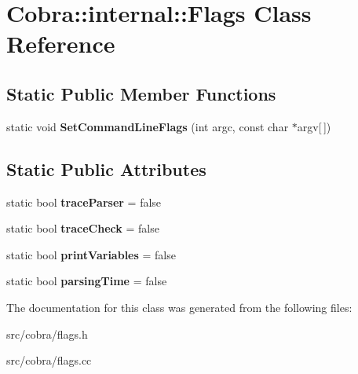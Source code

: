 \hypertarget{class_cobra_1_1internal_1_1_flags}{\section{Cobra\+:\+:internal\+:\+:Flags Class Reference}
\label{class_cobra_1_1internal_1_1_flags}
}
\subsection*{Static Public Member Functions}
\begin{DoxyCompactItemize}
\item 
\hypertarget{class_cobra_1_1internal_1_1_flags_a74931598fb17cee698b27975c5feda6e}{static void {\bfseries Set\+Command\+Line\+Flags} (int argc, const char $\ast$argv\mbox{[}$\,$\mbox{]})}\label{class_cobra_1_1internal_1_1_flags_a74931598fb17cee698b27975c5feda6e}

\end{DoxyCompactItemize}
\subsection*{Static Public Attributes}
\begin{DoxyCompactItemize}
\item 
\hypertarget{class_cobra_1_1internal_1_1_flags_ac08d43fe0936cb71bfee597af803dbe2}{static bool {\bfseries trace\+Parser} = false}\label{class_cobra_1_1internal_1_1_flags_ac08d43fe0936cb71bfee597af803dbe2}

\item 
\hypertarget{class_cobra_1_1internal_1_1_flags_a7181e6f3330ab86bff83a6520c74901e}{static bool {\bfseries trace\+Check} = false}\label{class_cobra_1_1internal_1_1_flags_a7181e6f3330ab86bff83a6520c74901e}

\item 
\hypertarget{class_cobra_1_1internal_1_1_flags_ae050100f3071586aebd9a89ec44db04f}{static bool {\bfseries print\+Variables} = false}\label{class_cobra_1_1internal_1_1_flags_ae050100f3071586aebd9a89ec44db04f}

\item 
\hypertarget{class_cobra_1_1internal_1_1_flags_afa0e8679e4526d6edbe06b935da2c4da}{static bool {\bfseries parsing\+Time} = false}\label{class_cobra_1_1internal_1_1_flags_afa0e8679e4526d6edbe06b935da2c4da}

\end{DoxyCompactItemize}


The documentation for this class was generated from the following files\+:\begin{DoxyCompactItemize}
\item 
src/cobra/flags.\+h\item 
src/cobra/flags.\+cc\end{DoxyCompactItemize}
